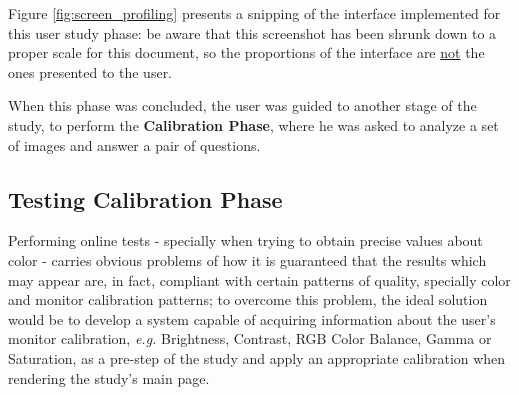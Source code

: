 %
Figure \ref{fig:screen_profiling} presents a snipping of the interface implemented for this user
study phase: be aware that this screenshot has been shrunk down to a proper scale for this document, so the proportions of the interface
are \ul{not} the ones presented to the user. \par
%
When this phase was concluded, the user was guided to another stage of the study, to perform the \textbf{Calibration Phase}, where
he was asked to analyze a set of images and answer a pair of questions. \par
%
%
\subsection{Testing Calibration Phase}
\label{subsec:design_calibration}
%
Performing online tests - specially when trying to obtain precise values about color - carries obvious problems of how it is guaranteed that
the results which may appear are, in fact, compliant with certain patterns of quality, specially color and monitor calibration patterns; to
overcome this problem, the ideal solution would be to develop a system capable of acquiring information about the user's monitor calibration,
\emph{e.g.} Brightness, Contrast, RGB Color Balance, Gamma or Saturation, as a pre-step of the study and apply an appropriate calibration when
rendering the study's main page. \par
%
